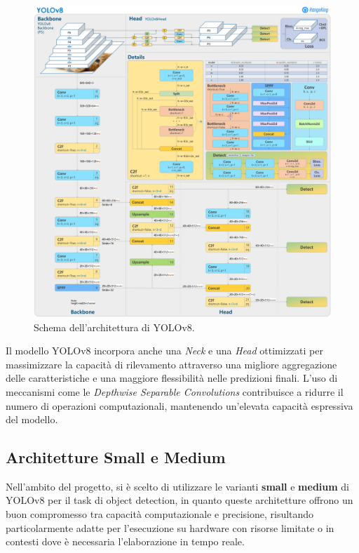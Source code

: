 \begin{figure}[h!]
    \centering
    \includegraphics[width=\textwidth]{yolov8_architecture.jpg}
    \caption{Schema dell'architettura di YOLOv8.}
    \label{fig:yolov8_architecture}
\end{figure}

Il modello YOLOv8 incorpora anche una \textit{Neck} e una \textit{Head} ottimizzati per massimizzare la capacità di rilevamento attraverso una migliore aggregazione delle caratteristiche e una maggiore flessibilità nelle predizioni finali. L'uso di meccanismi come le \textit{Depthwise Separable Convolutions} contribuisce a ridurre il numero di operazioni computazionali, mantenendo un'elevata capacità espressiva del modello.
\subsection{Architetture Small e Medium}

Nell'ambito del progetto, si è scelto di utilizzare le varianti \textbf{small} e \textbf{medium} di YOLOv8 per il task di object detection, in quanto queste architetture offrono un buon compromesso tra capacità computazionale e precisione, risultando particolarmente adatte per l'esecuzione su hardware con risorse limitate o in contesti dove è necessaria l'elaborazione in tempo reale.

